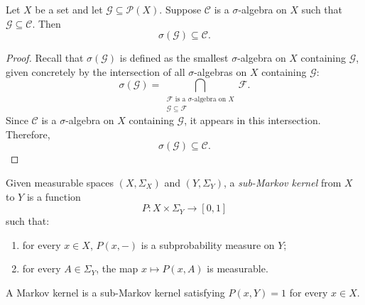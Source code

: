 \begin{lemma}\label{lem:minimality-sigma-algebra}
	Let $X$ be a set and let $\mathcal{G} \subseteq \mathcal{P}(X)$. 
	Suppose $\mathcal{C}$ is a $\sigma$-algebra on $X$ such that $\mathcal{G} \subseteq \mathcal{C}$. 
	Then
	\[
	\sigma(\mathcal{G}) \subseteq \mathcal{C}.
	\]
\end{lemma}

\begin{proof}
	Recall that $\sigma(\mathcal{G})$ is defined as the smallest $\sigma$-algebra 
	on $X$ containing $\mathcal{G}$, given concretely by the intersection of all 
	$\sigma$-algebras on $X$ containing $\mathcal{G}$:
	\[
	\sigma(\mathcal{G})
	=
	\bigcap_{\substack{\mathcal{F} \text{ is a } \sigma\text{-algebra on } X \\ \mathcal{G} \subseteq \mathcal{F}}}
	\mathcal{F}.
	\]
	Since $\mathcal{C}$ is a $\sigma$-algebra on $X$ containing $\mathcal{G}$, it 
	appears in this intersection. Therefore,
	\[
	\sigma(\mathcal{G}) \subseteq \mathcal{C}.
	\]
\end{proof}

\begin{definition}
Given measurable spaces $(X,\Sigma_X)$ and $(Y,\Sigma_Y)$, a
\emph{sub-Markov kernel} from $X$ to $Y$ is a function
\[
P:X\times\Sigma_Y\to[0,1]
\]
such that:
\begin{enumerate}
    \item for every $x\in X$, $P(x,-)$ is a subprobability measure on $Y$;
    \item for every $A\in\Sigma_Y$, the map $x\mapsto P(x,A)$ is measurable.
\end{enumerate}
A Markov kernel is a sub-Markov kernel satisfying $P(x,Y)=1$ for every
$x\in X$.
\end{definition}


